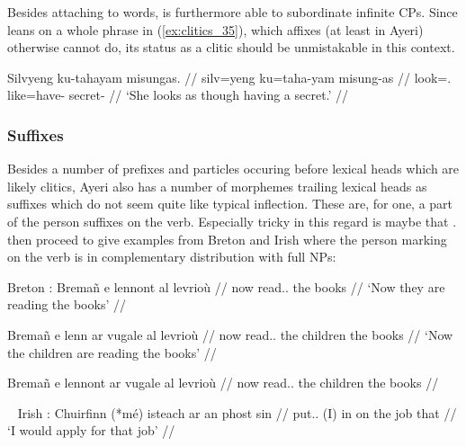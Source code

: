 \label{clitics_preverb_ku}
Besides attaching to words,  is furthermore able to subordinate
infinite CPs. Since  leans on a whole phrase in 
(\ref{ex:clitics_35}), which affixes (at least in Ayeri) otherwise cannot do,
its status as a clitic should be unmistakable in this context.

\ex\label{ex:clitics_36}\begingl
	\gla Silvyeng ku-tahayam misungas. //
	\glb silv=yeng ku=taha-yam misung-as //
	\glc look=\TsgF{}.\Aarg{} like=have-\Ptcp{} secret-\Parg{} //
	\glft `She looks as though having a secret.' //
\endgl\xe

\subsubsection{Suffixes}
\label{subsubsec:suffixes}

\label{clitics_postverb_person}
Besides a number of prefixes and particles occuring before lexical heads which
are likely clitics, Ayeri also has a number of morphemes trailing lexical heads
as suffixes which do not seem quite like typical inflection. These are, for
one, a part of the person suffixes on the verb. Especially tricky in this
regard is maybe that  \parencites[144]{spencerluis2012}[also
compare][101]{corbett2006}. \citet{spencerluis2012} then proceed to give
examples from Breton and Irish where the person marking on the verb is in
complementary distribution with full NPs:

\pex\label{ex:clitics_37}
Breton \parencites[145]{spencerluis2012}[from][]{borsleyetal2007}:
\a\label{ex:clitics_37a}
\begingl
	\gla Bremañ e lennont al levrioù //
	\glb now \Prt{} read.\Prs{}.\Tpl{} the books //
	\glft `Now they are reading the books' //
\endgl

\a\label{ex:clitics_37b}\begingl
	\gla Bremañ e lenn ar vugale al levrioù //
	\glb now \Prt{} read.\Prs{}.\Tsg{} the children the books //
	\glft `Now the children are reading the books' //
\endgl

\a\label{ex:clitics_37c}\ljudge{*}\begingl
	\gla Bremañ e lennont ar vugale al levrioù //
	\glb now \Prt{} read.\Prs{}.\Tpl{} the children the books //
\endgl
\xe

\pex~\label{ex:clitics_38}
Irish \parencites[145]{spencerluis2012}[from][]{mccloskeyhale1984}:
\a\label{ex:clitics_38a}
\begingl
	\gla Chuirfinn (*mé) isteach ar an phost sin //
	\glb put.\Cond{}.\Fsg{} (​I​) in on the job that //
	\glft `I would apply for that job' //
\endgl

